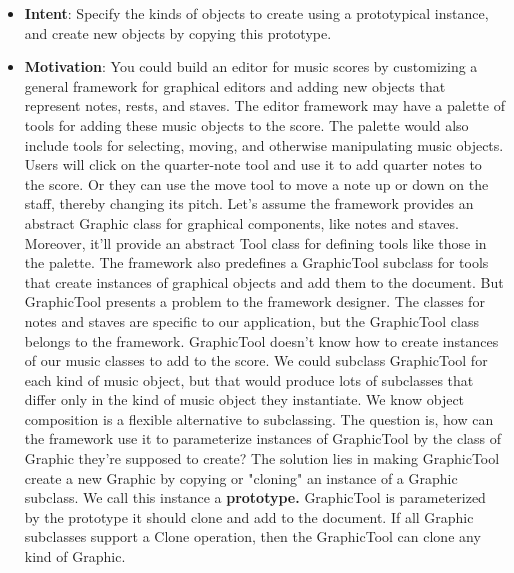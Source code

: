 \documentclass{report}
\begin{document}
\begin{itemize}
\begin{cppcode}
                Enemy* o1 = prototypeOrc.clone();
                Enemy* o2 = prototypeOrc.clone();
                Enemy* o3 = prototypeOrc.clone();
            \end{cppcode}
            \bigbreak \noindent 
            This is useful when object construction is complex, expensive, or depends on runtime state.
        \item \textbf{Intent}: Specify the kinds of objects to create using a prototypical instance, and create new objects by copying this prototype.
        \item \textbf{Motivation}: You could build an editor for music scores by customizing a general framework for graphical editors and adding new objects that represent notes, rests, and staves. The editor framework may have a palette of tools for adding these music objects to the score. The palette would also include tools for selecting, moving, and otherwise manipulating music objects. Users will click on the quarter-note tool and use it to add quarter notes to the score. Or they can use the move tool to move a note up or down on the staff, thereby changing its pitch.
            \bigbreak \noindent 
            Let's assume the framework provides an abstract Graphic class for graphical components, like notes and staves. Moreover, it'll provide an abstract Tool class for defining tools like those in the palette. The framework also predefines a GraphicTool subclass for tools that create instances of graphical objects and add them to the document.
            \bigbreak \noindent 
            But GraphicTool presents a problem to the framework designer. The classes for notes and staves are specific to our application, but the GraphicTool class belongs to the framework. GraphicTool doesn't know how to create instances of our music classes to add to the score. We could subclass GraphicTool for each kind of music object, but that would produce lots of subclasses that differ only in the kind of music object they instantiate. We know object composition is a flexible alternative to subclassing. The question is, how can the framework use it to parameterize instances of GraphicTool by the class of Graphic they're supposed to create?
            \bigbreak \noindent 
            The solution lies in making GraphicTool create a new Graphic by copying or "cloning" an instance of a Graphic subclass. We call this instance a \textbf{prototype.} GraphicTool is parameterized by the prototype it should clone and add to the document. If all Graphic subclasses support a Clone operation, then the GraphicTool can clone any kind of Graphic.

\end{itemize}
\end{document}
